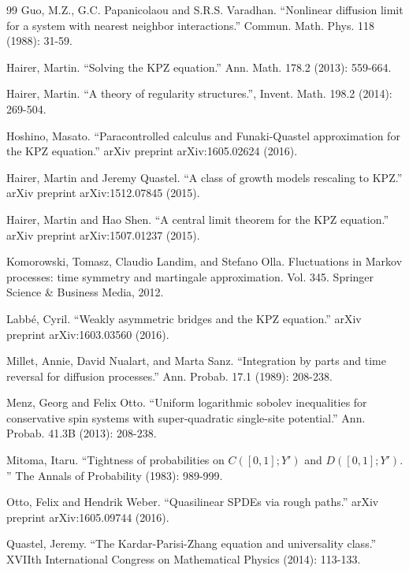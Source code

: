\documentclass[11pt, a4paper]{article}
\newcommand{\1}{\mathbf{1}}
\begin{document}
\begin{thebibliography}{99}
      Guo, M.Z., G.C. Papanicolaou and S.R.S. Varadhan. ``Nonlinear diffusion limit for a system with nearest neighbor interactions.'' Commun. Math. Phys. 118 (1988): 31-59.

     Hairer, Martin. ``Solving the KPZ equation.'' Ann. Math. 178.2 (2013): 559-664.

     Hairer, Martin. ``A theory of regularity structures.'', Invent. Math. 198.2 (2014): 269-504.
     
     Hoshino, Masato. ``Paracontrolled calculus and Funaki-Quastel approximation for the KPZ equation.'' arXiv preprint arXiv:1605.02624 (2016).

     Hairer, Martin and Jeremy Quastel. ``A class of growth models rescaling to KPZ.'' arXiv preprint arXiv:1512.07845 (2015).
     
     Hairer, Martin and Hao Shen. ``A central limit theorem for the KPZ equation.'' arXiv preprint arXiv:1507.01237 (2015).

    Komorowski, Tomasz, Claudio Landim, and Stefano Olla. Fluctuations in
    Markov processes: time symmetry and martingale approximation. Vol. 345.
    Springer Science \& Business Media, 2012.
    
    Labb\'e, Cyril. ``Weakly asymmetric bridges and the KPZ equation.'' arXiv preprint arXiv:1603.03560 (2016).

    Millet, Annie, David Nualart, and Marta Sanz. ``Integration by parts and
    time reversal for diffusion processes.'' Ann. Probab. 17.1 (1989):
    208-238.

    Menz, Georg and Felix Otto. ``Uniform logarithmic sobolev inequalities for conservative spin systems with super-quadratic single-site potential.'' Ann. Probab. 41.3B (2013):
    208-238.

     Mitoma, Itaru. ``Tightness of probabilities on $C ([0, 1]; Y')$ and $D ([0, 1]; Y').$'' The Annals of Probability (1983): 989-999.

    Otto, Felix and Hendrik Weber. ``Quasilinear SPDEs via rough paths.'' arXiv preprint arXiv:1605.09744 (2016).

    Quastel, Jeremy. ``The Kardar-Parisi-Zhang equation and universality class.'' XVIIth International Congress on Mathematical Physics (2014): 113-133.


\end{thebibliography}
\end{document}
